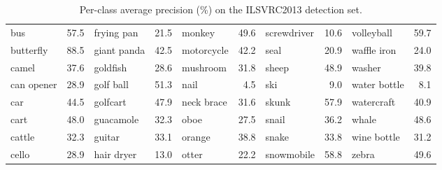 \begin{table}[t]
{\begin{tabular}{@{}lr|lr|lr|lr|lr@{}}
bus & 57.5 & frying pan & 21.5 & monkey & 49.6 & screwdriver & 10.6 & volleyball & 59.7 \\
butterfly & 88.5 & giant panda & 42.5 & motorcycle & 42.2 & seal & 20.9 & waffle iron & 24.0 \\
camel & 37.6 & goldfish & 28.6 & mushroom & 31.8 & sheep & 48.9 & washer & 39.8 \\
can opener & 28.9 & golf ball & 51.3 & nail & 4.5 & ski & 9.0 & water bottle & 8.1 \\
car & 44.5 & golfcart & 47.9 & neck brace & 31.6 & skunk & 57.9 & watercraft & 40.9 \\
cart & 48.0 & guacamole & 32.3 & oboe & 27.5 & snail & 36.2 & whale & 48.6 \\
cattle & 32.3 & guitar & 33.1 & orange & 38.8 & snake & 33.8 & wine bottle & 31.2 \\
cello & 28.9 & hair dryer & 13.0 & otter & 22.2 & snowmobile & 58.8 & zebra & 49.6 \\
\end{tabular}
}
\caption{Per-class average precision (\%) on the ILSVRC2013 detection \test set.}
\end{table}

